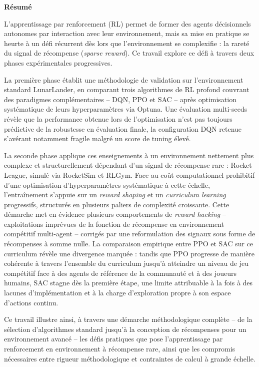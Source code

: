 \documentclass[a4paper, 11pt]{article}
\newcommand{\untitledsection}[1]{%
  \phantomsection
  \addcontentsline{toc}{section}{#1}
  \begin{center}
    \bfseries\Large #1
  \end{center}
  \vspace{1em}
}
\begin{document}
\newpage
\untitledsection{Résumé}
L'apprentissage par renforcement (RL) permet de former des agents décisionnels autonomes par interaction avec leur environnement, mais sa mise en pratique se heurte à un défi récurrent dès lors que l'environnement se complexifie : la rareté du signal de récompense (\textit{sparse reward}). Ce travail explore ce défi à travers deux phases expérimentales 
progressives.

La première phase établit une méthodologie de validation sur l'environnement standard LunarLander, en comparant trois algorithmes de RL profond couvrant des paradigmes complémentaires -- DQN, PPO et SAC -- après optimisation systématique de leurs hyperparamètres via Optuna. Une évaluation multi-seeds révèle que la performance obtenue lors de l'optimisation n'est pas toujours 
prédictive de la robustesse en évaluation finale, la configuration DQN retenue s'avérant notamment fragile malgré un score de tuning élevé.

La seconde phase applique ces enseignements à un environnement nettement plus complexe et structurellement dépendant d'un signal de récompense rare : Rocket League, simulé via RocketSim et RLGym. Face au coût computationnel prohibitif d'une optimisation d'hyperparamètres systématique à cette échelle, l'entraînement s'appuie sur un \textit{reward shaping} et un \textit{curriculum learning} progressifs, structurés en plusieurs paliers de complexité croissante. Cette démarche met en évidence plusieurs comportements de \textit{reward hacking} -- exploitations imprévues de la fonction de récompense en environnement compétitif multi-agent -- corrigés par une reformulation des signaux sous forme de récompenses à somme nulle. La comparaison empirique entre PPO et SAC sur ce curriculum révèle une divergence marquée : tandis que PPO progresse de manière cohérente à travers l'ensemble du curriculum jusqu'à atteindre un niveau de jeu compétitif face à des agents de référence de la communauté et à des joueurs humains, SAC stagne dès la première étape, une limite attribuable à la fois à des lacunes d'implémentation et à la charge d'exploration propre à son espace d'actions continu.

Ce travail illustre ainsi, à travers une démarche méthodologique complète -- de la sélection d'algorithmes standard jusqu'à la conception de récompenses pour un environnement avancé -- les défis pratiques que pose l'apprentissage par renforcement en environnement à récompense rare, ainsi que les compromis nécessaires entre rigueur méthodologique et contraintes de calcul à grande échelle.
\end{document}
